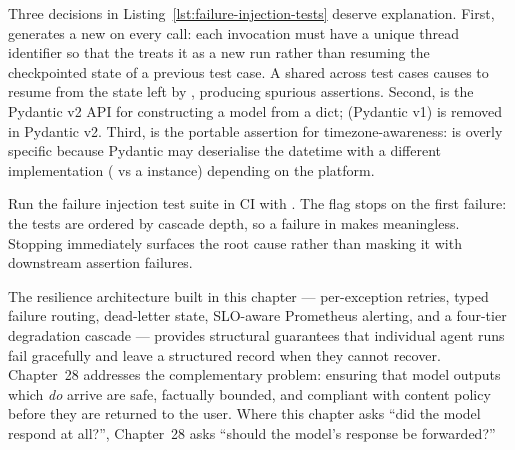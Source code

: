 Three decisions in Listing~\ref{lst:failure-injection-tests} deserve
explanation. First,  generates a new 
 on every call: each invocation must have a unique thread
identifier so that the  treats it as a new run rather
than resuming the checkpointed state of a previous test case. A shared
 across test cases causes 
to resume from the state left by , producing
spurious assertions. Second,  is the
Pydantic v2 API for constructing a model from a dict; 
(Pydantic v1) is removed in Pydantic v2. Third,
 is the portable assertion for
timezone-awareness:  is overly specific
because Pydantic may deserialise the datetime with a different
 implementation ( vs a
 instance) depending on the platform.

\begin{tipbox}
  Run the failure injection test suite in CI with
  .
  The  flag stops on the first failure: the tests are ordered by
  cascade depth, so a failure in 
  makes  meaningless.
  Stopping immediately surfaces the root cause rather than masking it with
  downstream assertion failures.
\end{tipbox}

The resilience architecture built in this chapter --- per-exception retries,
typed failure routing, dead-letter state, SLO-aware Prometheus alerting, and
a four-tier degradation cascade --- provides structural guarantees that
individual agent runs fail gracefully and leave a structured record when they
cannot recover. Chapter~28 addresses the complementary problem: ensuring
that model outputs which \emph{do} arrive are safe, factually bounded, and
compliant with content policy before they are returned to the user. Where
this chapter asks ``did the model respond at all?'', Chapter~28 asks
``should the model's response be forwarded?''
